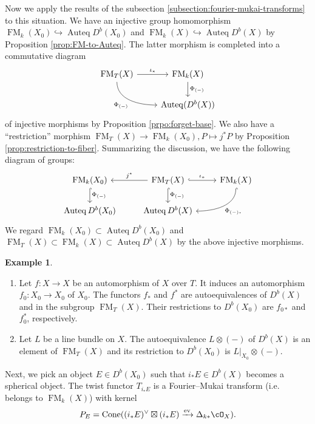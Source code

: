 \documentclass{amsart}
\numberwithin{equation}{section}
\theoremstyle{plain}
\theoremstyle{definition}
\newtheorem{example}[theorem]{Example}
\DeclareMathOperator{\Auteq}{\mathrm{Auteq}}
\DeclareMathOperator{\Cone}{\mathrm{Cone}}
\DeclareMathOperator{\ev}{\mathrm{ev}}
\DeclareMathOperator{\FM}{\mathrm{FM}}
\begin{document}
Now we apply the results of the subsection \ref{subsection:fourier-mukai-transforms} to this situation.
We have an injective group homomorphism $\FM_k(X_0) \hookrightarrow \Auteq D^b(X_0)$ and $\FM_k(X) \hookrightarrow \Auteq D^b(X)$ by Proposition \ref{prop:FM-to-Auteq}.
The latter morphism is completed into a commutative diagram
\[
    \begin{tikzcd}
        \FM_T(X) \ar[r, "\iota_*"] \ar[rd, out=-90, in=180, "\Phi_{(-)}"'] & \FM_k(X) \ar[d, "\Phi_{(-)}"] \\
        & \Auteq(D^b(X))
    \end{tikzcd}
\]
of injective morphisms by Proposition \ref{prpo:forget-base}.
We also have a ``restriction'' morphism $\FM_T(X) \to \FM_k(X_0), P \mapsto j^*P$ by Proposition \ref{prop:restriction-to-fiber}.
Summarizing the discussion, we have the following diagram of groups:
\[
    \begin{tikzcd}
        \FM_k(X_0) \ar[d, hookrightarrow, "\Phi_{(-)}"] & \FM_T(X)\ar[l, "j^*"']\ar[r, hookrightarrow, "\iota_*"]\ar[d, hookrightarrow, "\Phi_{(-)}"] & \FM_{k}(X) \ar[ld, hookrightarrow, out=-90, in=0, "\Phi_{(-)}"]\\
        \Auteq D^b(X_0) & \Auteq D^b(X)& \quad .
    \end{tikzcd}
\]
We regard $\FM_k(X_0) \subset \Auteq D^b(X_0)$ and $\FM_T(X) \subset \FM_k(X) \subset \Auteq D^b(X)$ by the above injective morphisms.
\begin{example}
    \begin{enumerate}
        \item Let $f \colon X \to X$ be an automorphism of $X$ over $T$.
              It induces an automorphism $f_0 \colon X_0 \to X_0$ of $X_0$.
              The functors $f_*$ and $f^*$ are autoequivalences of $D^b(X)$ and in the subgroup $\FM_T(X)$. Their restrictions to $D^b(X_0)$ are $f_{0*}$ and $f_0^*$, respectively.
        \item Let $L$ be a line bundle on $X$.
              The autoequivalence $L \otimes (-)$ of $D^b(X)$ is an element of $\FM_T(X)$ and its restriction to $D^b(X_0)$ is $L\vert_{X_0} \otimes (-)$.
    \end{enumerate}
\end{example}
Next, we pick an object $E \in D^b(X_0)$ such that $i_*E \in D^b(X)$ becomes a spherical object.
The twist functor $T_{i_*E}$ is a Fourier--Mukai transform (i.e.~ belongs to $\FM_k(X)$) with kernel
\begin{equation}
    P_E = \Cone((i_*E)^\vee \boxtimes (i_*E) \xrightarrow{\ev} \Delta_{k*}\cO_X).
\end{equation}
\end{document}
